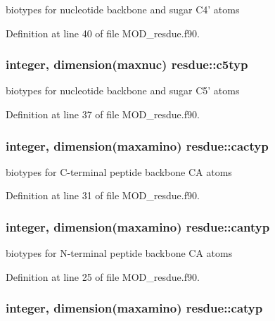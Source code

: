 biotypes for nucleotide backbone and sugar C4' atoms 



Definition at line 40 of file M\-O\-D\-\_\-resdue.\-f90.

\hypertarget{classresdue_a6643ae3326878cc4594ab3133a514951}{
\subsubsection[{c5typ}]{\setlength{\rightskip}{0pt plus 5cm}integer, dimension(maxnuc) resdue\-::c5typ}}\label{classresdue_a6643ae3326878cc4594ab3133a514951}


biotypes for nucleotide backbone and sugar C5' atoms 



Definition at line 37 of file M\-O\-D\-\_\-resdue.\-f90.

\hypertarget{classresdue_a7800b2083dda453b03ca0b1518245bb0}{
\subsubsection[{cactyp}]{\setlength{\rightskip}{0pt plus 5cm}integer, dimension(maxamino) resdue\-::cactyp}}\label{classresdue_a7800b2083dda453b03ca0b1518245bb0}


biotypes for C-\/terminal peptide backbone C\-A atoms 



Definition at line 31 of file M\-O\-D\-\_\-resdue.\-f90.

\hypertarget{classresdue_a127824bfd508340fba9a479d0e23444e}{
\subsubsection[{cantyp}]{\setlength{\rightskip}{0pt plus 5cm}integer, dimension(maxamino) resdue\-::cantyp}}\label{classresdue_a127824bfd508340fba9a479d0e23444e}


biotypes for N-\/terminal peptide backbone C\-A atoms 



Definition at line 25 of file M\-O\-D\-\_\-resdue.\-f90.

\hypertarget{classresdue_a25240da745223ff18029bc5158e49254}{
\subsubsection[{catyp}]{\setlength{\rightskip}{0pt plus 5cm}integer, dimension(maxamino) resdue\-::catyp}}\label{classresdue_a25240da745223ff18029bc5158e49254}



